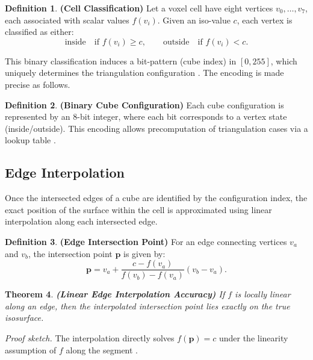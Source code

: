 \documentclass[12pt, a4paper, oneside]{book}
\theoremstyle{plain}
\newtheorem{theorem}{Theorem}[chapter]
\theoremstyle{definition}
\newtheorem{definition}[theorem]{Definition}
\theoremstyle{remark}
\theoremstyle{definition}
\begin{document}
\begin{definition}
    \textbf{(Cell Classification)}
Let a voxel cell have eight vertices $v_0, \dots, v_7$, each associated with scalar
values $f(v_i)$. Given an iso-value $c$, each vertex is classified as either:
\[
\text{inside} \quad \text{if } f(v_i) \geq c, \qquad \text{outside} \quad \text{if }
f(v_i) < c.
\]
\end{definition}

This binary classification induces a bit-pattern (cube index) in $[0,255]$, which
uniquely determines the triangulation configuration \cite{lorensen1998marching}. The
encoding is made precise as follows.

\begin{definition}
    \textbf{(Binary Cube Configuration)}
Each cube configuration is represented by an 8-bit integer, where each bit corresponds
to a vertex state (inside/outside). This encoding allows precomputation of triangulation
cases via a lookup table \cite{lorensen1998marching}.
\end{definition}

\vspace{0.5em}

\subsection{Edge Interpolation}

Once the intersected edges of a cube are identified by the configuration index, the exact
position of the surface within the cell is approximated using linear interpolation along
each intersected edge.

\begin{definition}
    \textbf{(Edge Intersection Point)}
For an edge connecting vertices $v_a$ and $v_b$, the intersection point $\mathbf{p}$ is
given by:
\[
\mathbf{p} = v_a + \frac{c - f(v_a)}{f(v_b) - f(v_a)} (v_b - v_a).
\]
\end{definition}

\begin{theorem}
    \textbf{(Linear Edge Interpolation Accuracy)}
If $f$ is locally linear along an edge, then the interpolated intersection point lies
exactly on the true isosurface.
\end{theorem}

\textit{Proof sketch.} The interpolation directly solves $f(\mathbf{p}) = c$ under the
linearity assumption of $f$ along the segment \cite{lorensen1998marching}.

\vspace{0.5em}
\end{document}
